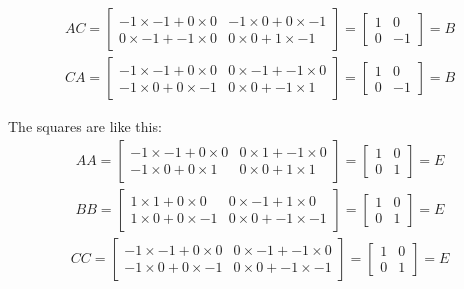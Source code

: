 \documentclass[11pt,oneside]{article}
\numberwithin{equation}{section}
\theoremstyle{definition}
\begin{document}
\begin{solution}
\begin{align*}
  A C = \begin{bmatrix}
    -1 \times -1 + 0 \times 0 & -1 \times 0 + 0 \times -1 \\
    0 \times -1 + -1 \times 0 & 0 \times 0 + 1 \times -1
  \end{bmatrix}
  = \begin{bmatrix}
    1 & 0 \\
    0 & -1
    \end{bmatrix} = B
\end{align*}
\begin{align*}
  C A = \begin{bmatrix}
    -1 \times -1 + 0 \times 0 & 0 \times -1 + -1 \times 0 \\
    -1 \times 0 + 0 \times -1 & 0 \times 0 + -1 \times 1
  \end{bmatrix}
  = \begin{bmatrix}
    1 & 0 \\
    0 & -1
    \end{bmatrix} = B
\end{align*}

The squares are like this:
\begin{align*}
  A A = \begin{bmatrix}
    -1 \times -1 + 0 \times 0 & 0 \times 1 + -1 \times 0 \\
    -1 \times 0 + 0 \times 1 & 0 \times 0 + 1 \times 1
  \end{bmatrix}
  = \begin{bmatrix}
    1 & 0 \\
    0 & 1
    \end{bmatrix} = E
\end{align*}
\begin{align*}
  B B = \begin{bmatrix}
    1 \times 1 + 0 \times 0 & 0 \times -1 + 1 \times 0 \\
    1 \times 0 + 0 \times -1 & 0 \times 0 + -1 \times -1
  \end{bmatrix}
  = \begin{bmatrix}
    1 & 0 \\
    0 & 1
    \end{bmatrix} = E
\end{align*}
\begin{align*}
  C C = \begin{bmatrix}
    -1 \times -1 + 0 \times 0 & 0 \times -1 + -1 \times 0 \\
    -1 \times 0 + 0 \times -1 & 0 \times 0 + -1 \times -1
  \end{bmatrix}
  = \begin{bmatrix}
    1 & 0 \\
    0 & 1
    \end{bmatrix} = E
\end{align*}


\end{solution}
\end{document}
